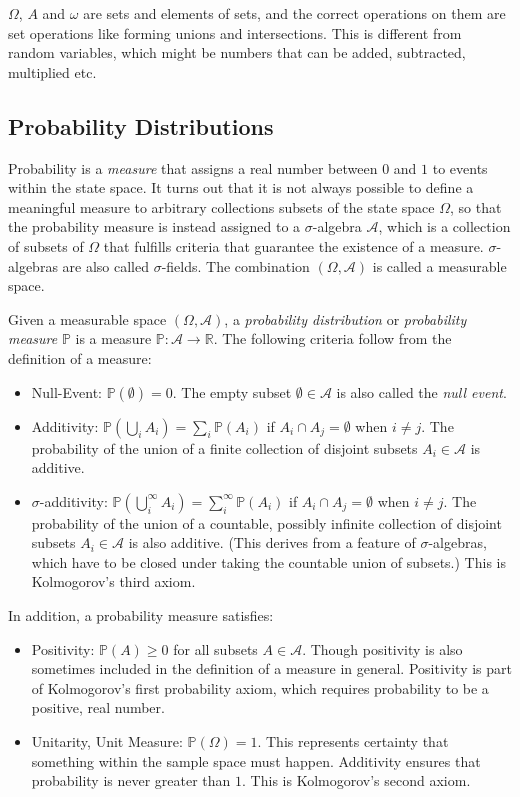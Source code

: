 $\Omega$, $A$ and $\omega$ are sets and elements of sets, and the correct operations on them are set operations like forming unions and intersections. This is different from random variables, which might be numbers that can be added, subtracted, multiplied etc.

\subsection{Probability Distributions}
Probability is a \textit{measure} that assigns a real number between $0$ and $1$ to events within the state space. It turns out that it is not always possible to define a meaningful measure to arbitrary collections subsets of the state space $\Omega$, so that the probability measure is instead assigned to a $\sigma$-algebra $\mathscr{A}$, which is a collection of subsets of $\Omega$ that fulfills criteria that guarantee the existence of a measure. $\sigma$-algebras are also called $\sigma$-fields. The combination $(\Omega, \mathscr{A})$ is called a measurable space. 

Given a measurable space $(\Omega, \mathscr{A})$, a \textit{probability distribution} or \textit{probability measure} $\mathbb{P}$ is a measure $\mathbb{P}:\mathscr{A} \rightarrow \mathbb{R}$. The following criteria follow from the definition of a measure: 

\begin{itemize}
\item Null-Event: $\mathbb{P}(\emptyset) = 0$. The empty subset $\emptyset \in \mathscr{A}$ is also called the \textit{null event}.
\item Additivity: $\mathbb{P}(\bigcup_i A_i) = \sum_i \mathbb{P}(A_i)$ if $A_i \cap A_j = \emptyset$  when $i \neq j$. The probability of the union of a finite collection of disjoint subsets $A_i \in \mathscr{A}$ is additive. 
\item $\sigma$-additivity: $\mathbb{P}(\bigcup^{\infty}_i A_i) = \sum^{\infty}_i \mathbb{P}(A_i)$ if $A_i \cap A_j = \emptyset$  when $i \neq j$. The probability of the union of a countable, possibly infinite collection of disjoint subsets $A_i \in \mathscr{A}$ is also additive. (This derives from a feature of $\sigma$-algebras, which have to be closed under taking the countable union of subsets.) This is Kolmogorov's third axiom.
\end{itemize} 

In addition, a probability measure satisfies:

\begin{itemize}
\item Positivity: $\mathbb{P}(A) \geq 0$ for all subsets $A\in\mathscr{A}$. Though positivity is also sometimes included in the definition of a measure in general. Positivity is part of Kolmogorov's first probability axiom, which requires probability to be a positive, real number.
\item Unitarity, Unit Measure: $\mathbb{P}(\Omega) = 1$. This represents certainty that something within the sample space must happen. Additivity ensures that probability is never greater than $1$. This is Kolmogorov's second axiom. 
\end{itemize}

